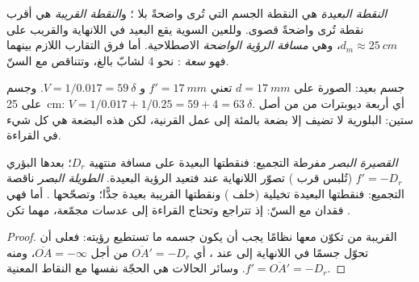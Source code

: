 \begin{definition}\label{def:b1:optical-instruments:punctum}
\emph{النقطة البعيدة} هي النقطة الجسم التي تُرى
واضحةً بلا ؛ و\emph{النقطة القريبة} هي أقرب نقطة تُرى واضحةً
 قصوى. وللعين السوية
يقع البعيد في اللانهاية والقريب على
$d_m \approx \qty{25}{cm}$، وهي \emph{مسافة الرؤية الواضحة}
الاصطلاحية. أما فرق التقارب اللازم بينهما فهو
\emph{سعة }: نحو \qty{4}{\delta} لشابّ
بالغ، وتتناقص مع السنّ.
\end{definition}

\begin{example}\label{ex:b1:optical-instruments:vergence}
جسم بعيد: الصورة على $d = \qty{17}{mm}$ تعني $f' = \qty{17}{mm}$ و
$V = 1/0.017 = \qty{59}{\delta}$. وجسم على \qty{25}{cm}:
$V = 1/0.017 + 1/0.25 = 59 + 4 = \qty{63}{\delta}$. أي أربعة ديوبترات من
 من أصل ستين:  البلورية لا تضيف إلا بضعة بالمئة
إلى عمل القرنية، لكن هذه البضعة هي كل شيء في القراءة.
\end{example}

\begin{proposition}\label{prop:b1:optical-instruments:defects}
 \emph{القصيرة البصر} مفرطة التجميع: فنقطتها البعيدة على مسافة
منتهية $D_r$؛  بعدها البؤري $f' = -D_r$ (تُلبس
قرب ) تصوّر اللانهاية عند  فتعيد الرؤية
البعيدة.  \emph{الطويلة البصر} ناقصة التجميع: فنقطتها البعيدة
تخيلية (خلف ) ونقطتها القريبة بعيدة جدًّا؛ وتصحّحها . أما \emph{} فهي فقدان  مع
السنّ: إذ تتراجع  وتحتاج القراءة إلى عدسات مجمّعة،
مهما تكن .
\end{proposition}

\begin{proof}
 القريبة من  تكوّن معها نظامًا يجب أن يكون جسمه
ما تستطيع  رؤيته: فعلى  أن تحوّل جسمًا في اللانهاية إلى
 عند ، أي $\overline{OA'} = -D_r$ من أجل
$\overline{OA} = -\infty$، ومنه $f' = \overline{OA'} = -D_r$. وسائر
الحالات هي الحجّة نفسها مع النقاط المعنية.
\end{proof}

